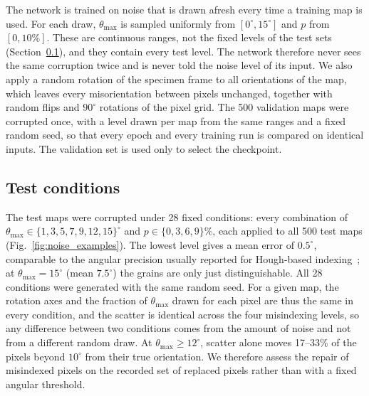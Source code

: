 The network is trained on noise that is drawn afresh every time a training map
is used. For each draw, $\theta_{\max}$ is sampled uniformly from
$[0^\circ, 15^\circ]$ and $p$ from $[0, 10\%]$. These are continuous ranges,
not the fixed levels of the test sets (Section~\ref{sec:test_conditions}),
and they contain every test level. The network therefore never sees the
same corruption twice and is never told the noise level of its input. We also
apply a random rotation of the specimen frame to all orientations of the map,
which leaves every misorientation between pixels unchanged, together with
random flips and $90^\circ$ rotations of the pixel grid. The 500 validation
maps were corrupted once, with a level drawn per map from the same ranges and a
fixed random seed, so that every epoch and every training run is compared on
identical inputs. The validation set is used only to select the checkpoint.

\subsection{Test conditions}
\label{sec:test_conditions}

The test maps were corrupted under 28 fixed conditions: every combination of
$\theta_{\max} \in \{1, 3, 5, 7, 9, 12, 15\}^\circ$ and
$p \in \{0, 3, 6, 9\}\%$, each applied to all 500 test maps
(Fig.~\ref{fig:noise_examples}). The lowest level gives a mean error of
$0.5^\circ$, comparable to the angular precision usually reported for
Hough-based indexing~\cite{demirel2009accuracy}; at $\theta_{\max} = 15^\circ$
(mean $7.5^\circ$) the grains are only just distinguishable. All 28
conditions were generated with the same random seed. For a given map, the
rotation axes and the fraction of $\theta_{\max}$ drawn for each pixel are thus
the same in every condition, and the scatter is identical across the four
misindexing levels, so any difference between two conditions comes from the
amount of noise and not from a different random draw. At
$\theta_{\max} \geq 12^\circ$, scatter alone moves 17--33\% of the pixels
beyond $10^\circ$ from their true orientation. We therefore assess the repair
of misindexed pixels on the recorded set of replaced pixels rather than with a
fixed angular threshold.

